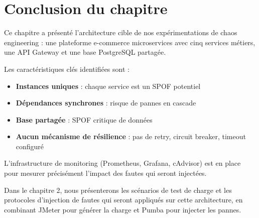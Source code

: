 \section*{Conclusion du chapitre}

Ce chapitre a présenté l'architecture cible de nos expérimentations de chaos engineering : une plateforme e-commerce microservices avec cinq services métiers, une API Gateway et une base PostgreSQL partagée. 

Les caractéristiques clés identifiées sont :
\begin{itemize}
    \item \textbf{Instances uniques} : chaque service est un SPOF potentiel
    \item \textbf{Dépendances synchrones} : risque de pannes en cascade
    \item \textbf{Base partagée} : SPOF critique de données
    \item \textbf{Aucun mécanisme de résilience} : pas de retry, circuit breaker, timeout configuré
\end{itemize}

L'infrastructure de monitoring (Prometheus, Grafana, cAdvisor) est en place pour mesurer précisément l'impact des fautes qui seront injectées.

Dans le chapitre 2, nous présenterons les scénarios de test de charge et les protocoles d'injection de fautes qui seront appliqués sur cette architecture, en combinant JMeter pour générer la charge et Pumba pour injecter les pannes.